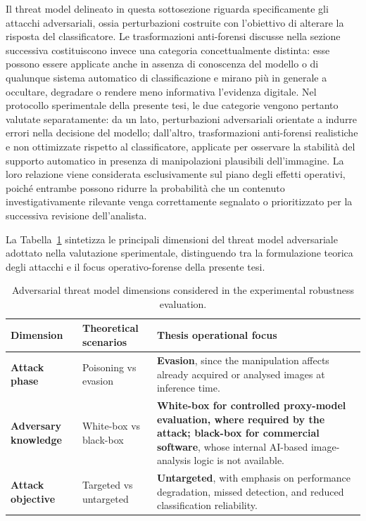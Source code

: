 Il threat model delineato in questa sottosezione riguarda specificamente gli attacchi adversariali, ossia perturbazioni costruite con l'obiettivo di alterare la risposta del classificatore. Le trasformazioni anti-forensi discusse nella sezione successiva costituiscono invece una categoria concettualmente distinta: esse possono essere applicate anche in assenza di conoscenza del modello o di qualunque sistema automatico di classificazione e mirano più in generale a occultare, degradare o rendere meno informativa l'evidenza digitale. Nel protocollo sperimentale della presente tesi, le due categorie vengono pertanto valutate separatamente: da un lato, perturbazioni adversariali orientate a indurre errori nella decisione del modello; dall'altro, trasformazioni anti-forensi realistiche e non ottimizzate rispetto al classificatore, applicate per osservare la stabilità del supporto automatico in presenza di manipolazioni plausibili dell'immagine. La loro relazione viene considerata esclusivamente sul piano degli effetti operativi, poiché entrambe possono ridurre la probabilità che un contenuto investigativamente rilevante venga correttamente segnalato o prioritizzato per la successiva revisione dell'analista.

La Tabella~\ref{tab:threat_model} sintetizza le principali dimensioni del threat model adversariale adottato nella valutazione sperimentale, distinguendo tra la formulazione teorica degli attacchi e il focus operativo-forense della presente tesi.

\begin{table}[htbp]
    \centering
    \small
    \renewcommand{\arraystretch}{1.25}
    \begin{tabular}{@{}p{}p{}p{}@{}}
        \toprule
        \textbf{Dimension} & \textbf{Theoretical scenarios} & \textbf{Thesis operational focus} \\
        \midrule
        \textbf{Attack phase} &
        Poisoning vs evasion &
        \textbf{Evasion}, since the manipulation affects already acquired or analysed images at inference time. \\
        \textbf{Adversary knowledge} &
        White-box vs black-box &
        \textbf{White-box for controlled proxy-model evaluation, where required by the attack; black-box for commercial software}, whose internal AI-based image-analysis logic is not available. \\
        \textbf{Attack objective} &
        Targeted vs untargeted &
        \textbf{Untargeted}, with emphasis on performance degradation, missed detection, and reduced classification reliability. \\
        \bottomrule
    \end{tabular}
    \caption{Adversarial threat model dimensions considered in the experimental robustness evaluation.}
    \label{tab:threat_model}
\end{table}



